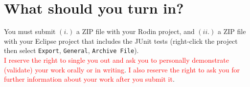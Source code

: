 \documentclass{article} %
\begin{document}
\section*{What should you turn in?}
\label{sec_what_to_turnin}

You must submit $(i.)$ a ZIP file with your Rodin project, and $(ii.)$ a ZIP file with your
Eclipse project that includes the JUnit tests (right-click the project then select \texttt{Export},
\texttt{General}, \texttt{Archive File}).~\\

\smallskip
%
  \textcolor{red}{I reserve the right to single you out and ask you to
    personally demonstrate (validate) your work orally or in
    writing}. \textcolor{red}{I also reserve the right to ask you for
    further information about your work after you submit it}.
\end{document}
